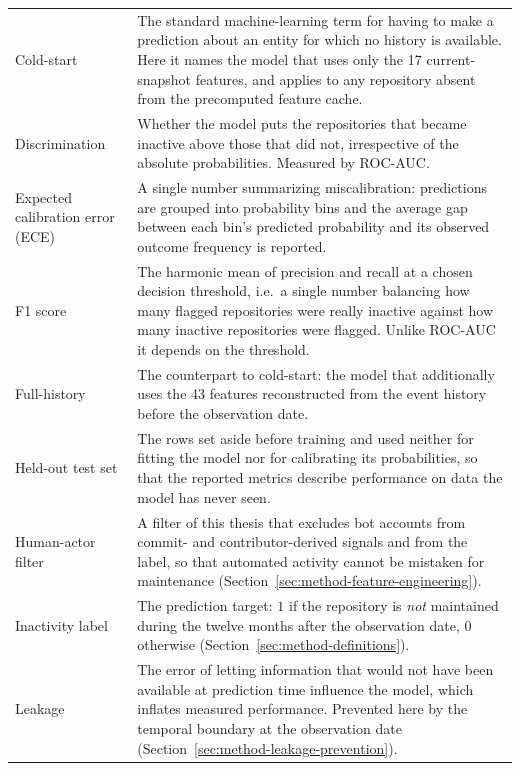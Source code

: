 {\begin{longtable}{p{} p{}}
Cold-start &
The standard machine-learning term for having to make a prediction about an entity
for which no history is available. Here it names the model that uses only the 17
current-snapshot features, and applies to any repository absent from the
precomputed feature cache. \\

Discrimination &
Whether the model puts the repositories that became inactive above those that did
not, irrespective of the absolute probabilities. Measured by ROC-AUC. \\

Expected calibration error (ECE) &
A single number summarizing miscalibration: predictions are grouped into
probability bins and the average gap between each bin's predicted probability and
its observed outcome frequency is reported. \\

F1 score &
The harmonic mean of precision and recall at a chosen decision threshold, i.e.\ a
single number balancing how many flagged repositories were really inactive against
how many inactive repositories were flagged. Unlike ROC-AUC it depends on the
threshold. \\

Full-history &
The counterpart to cold-start: the model that additionally uses the 43 features
reconstructed from the event history before the observation date. \\

Held-out test set &
The rows set aside before training and used neither for fitting the model nor for
calibrating its probabilities, so that the reported metrics describe performance
on data the model has never seen. \\

Human-actor filter &
A filter of this thesis that excludes bot accounts from commit- and
contributor-derived signals and from the label, so that automated activity cannot
be mistaken for maintenance (Section~\ref{sec:method-feature-engineering}). \\

Inactivity label &
The prediction target: \(1\) if the repository is \emph{not} maintained during the
twelve months after the observation date, \(0\) otherwise
(Section~\ref{sec:method-definitions}). \\

Leakage &
The error of letting information that would not have been available at prediction
time influence the model, which inflates measured performance. Prevented here by
the temporal boundary at the observation date
(Section~\ref{sec:method-leakage-prevention}). \\


\end{longtable}}
